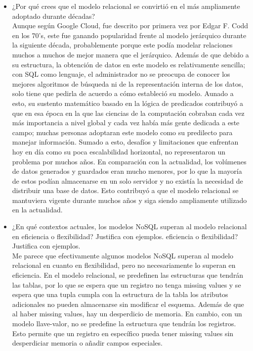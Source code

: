 \documentclass[12pt]{report}
\begin{document}
\begin{enumerate}[label=\textbf{\arabic*.}, leftmargin=*]
\begin{enumerate}[label=\textbf{\alph*.}, leftmargin=*, itemsep=1.0em]
\begin{itemize}
  \item ¿Por qu\'e crees que el modelo relacional se convirti\'o en el m\'as ampliamente adoptado durante d\'ecadas?\\
    Aunque según Google Cloud, fue descrito por primera vez por Edgar F. Codd en los 70's, este fue ganando popularidad frente al modelo jerárquico durante la siguiente década, probablemente porque este podía modelar relaciones muchos a muchos de mejor manera que el jerárquico. Además de que debido a su estructura, la obtención de datos en este modelo es relativamente sencilla; con SQL como lenguaje, el administrador no se preocupa de conocer los mejores algoritmos de búsqueda ni de la representación interna de los datos, solo tiene que pedirla de acuerdo a cómo estableció su modelo.
    Aunado a esto, su sustento matemático basado en la lógica de predicados
    contribuyó a que en esa época en la que las ciencias de la computación cobraban cada vez más importancia a nivel global y cada vez había más gente dedicada a este campo; muchas personas adoptaran este modelo como su predilecto para manejar información.
    Sumado a esto, desafíos y limitaciones que enfrentan hoy en día como su poca escalabilidad horizontal, no representaron un problema por muchos años.
    En comparación con la actualidad, los volúmenes de datos generados y guardados eran mucho menores, por lo que la mayoría de estos podían almacenarse en un solo servidor y no existía la necesidad de distribuir una base de datos. Esto contribuyó a que el modelo relacional se mantuviera vigente durante muchos años y siga siendo ampliamente utilizado en la actualidad.

  \item ¿En qu\'e contextos actuales, los modelos NoSQL superan al modelo relacional en eficiencia o flexibilidad? Justifica con ejemplos.
  eficiencia o flexibilidad? Justifica con ejemplos.\\
    Me parece que efectivamente algunos modelos NoSQL superan al modelo relacional en cuanto en flexibilidad, pero no necesariamente lo superan en eficiencia.
    En el modelo relacional, se predefinen las estructuras que tendrán las tablas, por lo que se espera que un registro no tenga missing values y se espera que una tupla cumpla con la estructura de la tabla los atributos adicionales no pueden almacenarse sin modificar el esquema.
    Además de que al haber missing values, hay un desperdicio de memoria.
    En cambio, con un modelo llave-valor, no se predefine la estructura que tendrán los registros. Esto permite que un registro en específico pueda tener missing values sin desperdiciar memoria o añadir campos especiales.


\end{itemize}
\end{enumerate}
\end{enumerate}
\end{document}
